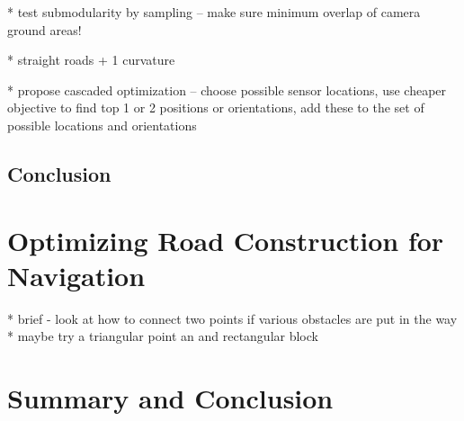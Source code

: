 \documentclass[a4paper,12pt,twoside,openright]{report}
\begin{document}
* test submodularity by sampling -- make sure minimum overlap of camera ground areas!

* straight roads + 1 curvature

* propose cascaded optimization -- choose possible sensor locations, use cheaper objective to find top 1 or 2 
positions or orientations, add these to the set of possible locations and orientations


\section{Conclusion}

\chapter{Optimizing Road Construction for Navigation}

* brief - look at how to connect two points if various obstacles are put in the way
* maybe try a triangular point an and rectangular block 


\chapter{Summary and Conclusion} 




\appendix
\singlespacing

\printbibliography
\end{document}
